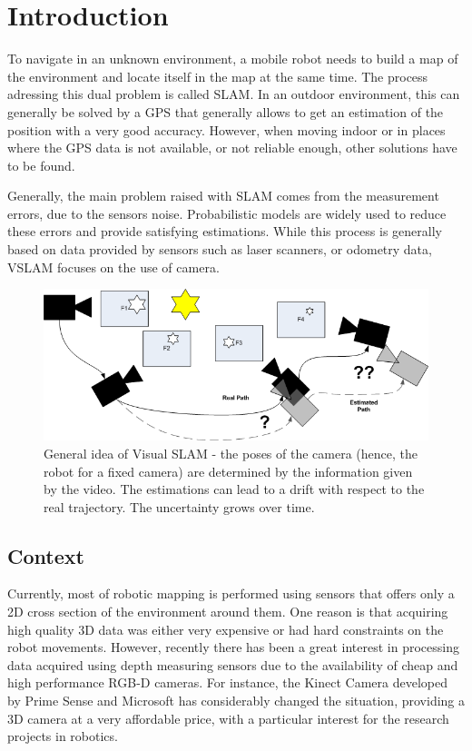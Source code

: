 \chapter{Introduction}

To navigate in an unknown environment, a mobile robot needs to build a map of the environment and locate itself in the map at the same time. The process adressing this dual problem is called \gls{SLAM}. In an outdoor environment, this can generally be solved by a GPS that generally allows to get an estimation of the position with a very good accuracy. However, when moving indoor or in places where the GPS data is not available, or not reliable enough, other solutions have to be found. 

Generally, the main problem raised with \gls{SLAM} comes from the measurement errors, due to the sensors noise. Probabilistic models are widely used to reduce these errors and provide satisfying estimations. While this process is generally based on data provided by sensors such as laser scanners, or odometry data, \gls{VSLAM} focuses on the use of camera. 

\begin{figure}[h!]
\begin{center}
\includegraphics[width=1.0\textwidth]{figures/visual_slam}
\caption{General idea of Visual SLAM - the poses of the camera (hence, the robot for a fixed camera) are determined by the information given by the video. The estimations can lead to a drift with respect to the real trajectory. The uncertainty grows over time.}
\end{center}
\end{figure}

\section{Context}

Currently, most of robotic mapping is performed using sensors that offers only a 2D cross section of the environment around them. One reason is that acquiring high quality 3D data was either very expensive or had hard constraints on the robot movements. However, recently there has been a great interest in processing data acquired using depth measuring sensors due to the availability of cheap and high performance RGB-D cameras. For instance, the Kinect Camera developed by Prime Sense and Microsoft has considerably changed the situation, providing a 3D camera at a very affordable price, with a particular interest for the research projects in robotics.

